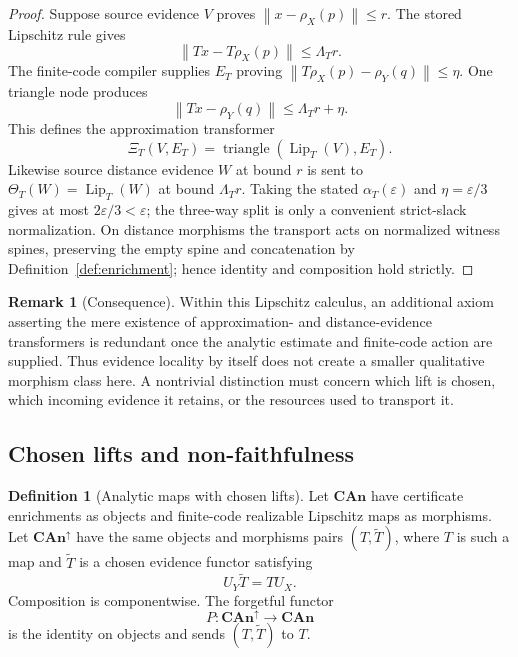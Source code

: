 \documentclass[11pt]{article}
\theoremstyle{definition}
\newtheorem{definition}[theorem]{Definition}
\newtheorem{remark}[theorem]{Remark}
\newcommand{\norm}[1]{\left\lVert #1 \right\rVert}
\begin{document}
\begin{proof}
Suppose source evidence $V$ proves
$\norm{x-\rho_X(p)}\le r$.  The stored Lipschitz rule gives
\[
 \norm{Tx-T\rho_X(p)}\le\Lambda_T r.
\]
The finite-code compiler supplies $E_T$ proving
$\norm{T\rho_X(p)-\rho_Y(q)}\le\eta$.  One triangle node produces
\[
 \norm{Tx-\rho_Y(q)}\le\Lambda_T r+\eta.
\]
This defines the approximation transformer
\[
 \Xi_T(V,E_T)=\operatorname{triangle}(\operatorname{Lip}_T(V),E_T).
\]
Likewise source distance evidence $W$ at bound $r$ is sent to
$\Theta_T(W)=\operatorname{Lip}_T(W)$ at bound $\Lambda_T r$.  Taking the stated $\alpha_T(\varepsilon)$ and $\eta=\varepsilon/3$ gives at most
$2\varepsilon/3<\varepsilon$; the three-way split is only a convenient strict-slack
normalization.  On distance morphisms the transport acts on normalized witness spines,
preserving the empty spine and concatenation by Definition~\ref{def:enrichment}; hence
identity and composition hold strictly.
\end{proof}

\begin{remark}[Consequence]
Within this Lipschitz calculus, an additional axiom asserting the mere existence of
approximation- and distance-evidence transformers is redundant once the analytic estimate
and finite-code action are supplied.  Thus evidence locality by itself does not create a
smaller qualitative morphism class here.  A nontrivial distinction must concern which
lift is chosen, which incoming evidence it retains, or the resources used to transport it.
\end{remark}

\subsection{Chosen lifts and non-faithfulness}

\begin{definition}[Analytic maps with chosen lifts]\label{def:chosen}
Let $\mathbf{CAn}$ have certificate enrichments as objects and finite-code realizable
Lipschitz maps as morphisms.  Let $\mathbf{CAn}^{\uparrow}$ have the same objects and
morphisms pairs $(T,\widetilde T)$, where $T$ is such a map and $\widetilde T$ is a
chosen evidence functor satisfying
\[
 U_Y\widetilde T=T U_X.
\]
Composition is componentwise.  The forgetful functor
\[
 P:\mathbf{CAn}^{\uparrow}\to\mathbf{CAn}
\]
is the identity on objects and sends $(T,\widetilde T)$ to $T$.
\end{definition}
\end{document}
